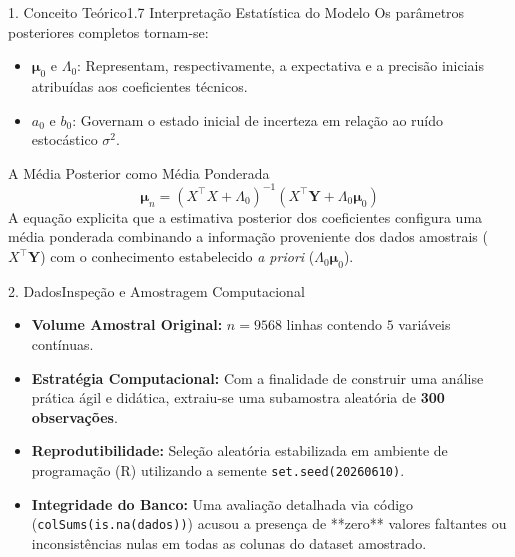 \documentclass[10pt,aspectratio=169]{beamer}
\begin{document}
\begin{frame}{1. Conceito Teórico}{1.7 Interpretação Estatística do Modelo}
    Os parâmetros posteriores completos tornam-se:
    \begin{itemize}
        \item $\boldsymbol{\mu}_0$ e $\Lambda_0$: Representam, respectivamente, a expectativa e a precisão iniciais atribuídas aos coeficientes técnicos.
        \item $a_0$ e $b_0$: Governam o estado inicial de incerteza em relação ao ruído estocástico $\sigma^2$.
    \end{itemize}
    \begin{block}{A Média Posterior como Média Ponderada}
        $$\boldsymbol{\mu}_n = (X^\top X + \Lambda_0)^{-1}(X^\top \mathbf{Y} + \Lambda_0 \boldsymbol{\mu}_0)$$
        A equação explicita que a estimativa posterior dos coeficientes configura uma média ponderada combinando a informação proveniente dos dados amostrais ($X^\top \mathbf{Y}$) com o conhecimento estabelecido \textit{a priori} ($\Lambda_0 \boldsymbol{\mu}_0$).
    \end{block}
\end{frame}

\begin{frame}{2. Dados}{Inspeção e Amostragem Computacional}
    \begin{itemize}
        \item \textbf{Volume Amostral Original:} $n = 9568$ linhas contendo $5$ variáveis contínuas.
        \item \textbf{Estratégia Computacional:} Com a finalidade de construir uma análise prática ágil e didática, extraiu-se uma subamostra aleatória de \textbf{300 observações}.
        \item \textbf{Reprodutibilidade:} Seleção aleatória estabilizada em ambiente de programação (R) utilizando a semente \texttt{set.seed(20260610)}.
        \item \textbf{Integridade do Banco:} Uma avaliação detalhada via código (\texttt{colSums(is.na(dados))}) acusou a presença de **zero** valores faltantes ou inconsistências nulas em todas as colunas do dataset amostrado.
    \end{itemize}
\end{frame}
\end{document}
